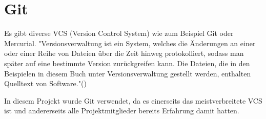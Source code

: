 \renewcommand{\kapitelautor}{Autor: Felix Zwickelstorfer}

\section{Git}\label{sec:git}

Es gibt diverse VCS (Version Control System) wie zum Beispiel Git oder Mercurial.
"Versionsverwaltung ist ein System, welches die Änderungen an einer oder einer Reihe von Dateien über die Zeit hinweg protokolliert, sodass man später auf eine bestimmte Version zurückgreifen kann.
Die Dateien, die in den Beispielen in diesem Buch unter Versionsverwaltung gestellt werden, enthalten Quelltext von Software."(\cite{gitVSC}) %

In diesem Projekt wurde Git verwendet, da es einerseits das meistverbreitete VCS ist und andererseits alle Projektmitglieder bereits Erfahrung damit hatten.




